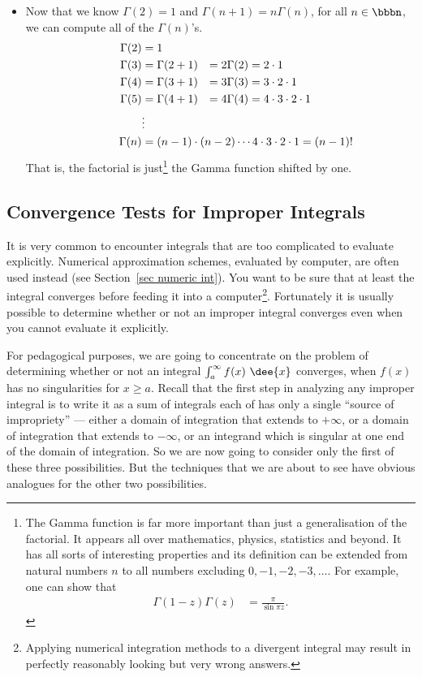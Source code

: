 \begin{eg}
\begin{itemize}
\item Now that we know $\Gamma(2)=1$ and $\Gamma(n+1)= n\Gamma(n)$, for all
$n\in\bbbn$, we can compute all of the $\Gamma(n)$'s.
\begin{alignat*}{4}
\Gamma(2)&=1 \\
\Gamma(3)&=\Gamma(2+1)&=2\Gamma(2)&=2\cdot 1 \\
\Gamma(4)&=\Gamma(3+1)&=3\Gamma(3)&=3\cdot2\cdot 1 \\
\Gamma(5)&=\Gamma(4+1)&=4\Gamma(4)&=4\cdot3\cdot 2\cdot 1 \\
         &\vdots\\
\Gamma(n)&=(n-1)\cdot(n-2)\cdots 4\cdot 3\cdot 2\cdot 1 = (n-1)!\hidewidth
\end{alignat*}
That is, the factorial is just\footnote{The Gamma function is far more
important than just a generalisation of the factorial. It appears all over
mathematics, physics, statistics and beyond. It has all sorts of interesting
properties and its definition can be extended from natural numbers $n$ to all
numbers excluding $0,-1,-2,-3,\dots$. For example, one can show that
\begin{align*}
  \Gamma(1-z)\Gamma(z) &= \frac{\pi}{\sin \pi z}.
\end{align*}
 } the Gamma function shifted by one.
\end{itemize}
\end{eg}

\subsection{Convergence Tests for Improper Integrals}
It is very common to encounter integrals that are too complicated to
evaluate explicitly. Numerical approximation schemes, evaluated by computer, are
often used instead (see Section~\ref{sec numeric int}). You want to be sure that
at least the integral converges before feeding it into a
computer\footnote{Applying numerical integration methods to a divergent integral
may result in perfectly reasonably looking but very wrong answers.}. Fortunately
it is usually possible to determine whether or not an improper integral
converges even when you cannot evaluate it explicitly.

\begin{remark}\label{rmk:singularities}
For pedagogical purposes, we are going to concentrate on the problem of
determining whether or not an integral $\int_a^\infty f(x)\ \dee{x}$ converges,
when $f(x)$ has no singularities for $x\ge a$. Recall that the first step in
analyzing any improper integral is to write it as a sum of integrals each of has
only a single ``source of impropriety'' --- either a domain of integration that
extends to $+\infty$, or a domain of integration that extends to $-\infty$, or
an integrand which is singular at one end of the domain of integration. So we
are now going to consider only the first of these three possibilities. But the
techniques that we are about to see have obvious analogues for the other two
possibilities.
\end{remark}

